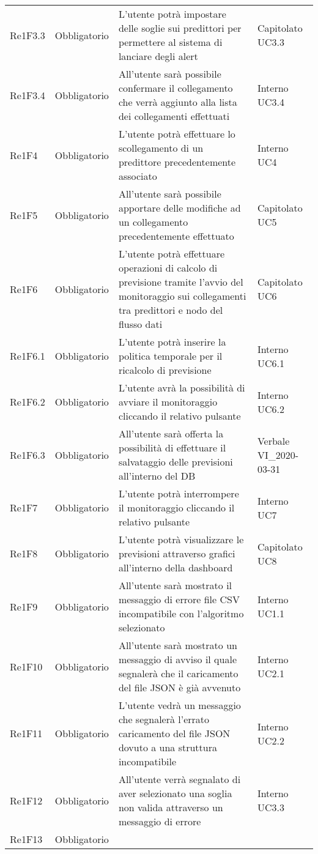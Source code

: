 \begin{longtable}{C{3cm} C{3cm} L{5.5cm} C{3cm}}
Re1F3.3 & Obbligatorio & L’utente potrà impostare delle soglie sui predittori per permettere al sistema di lanciare degli alert &  Capitolato UC3.3\\
Re1F3.4 & Obbligatorio & All’utente sarà possibile confermare il collegamento che verrà aggiunto alla lista dei collegamenti effettuati &  Interno UC3.4\\
Re1F4 & Obbligatorio & L’utente potrà effettuare lo scollegamento di un predittore precedentemente associato &  Interno UC4\\
Re1F5 & Obbligatorio & All’utente sarà possibile apportare delle modifiche ad un collegamento precedentemente effettuato & Capitolato UC5\\
Re1F6 & Obbligatorio & L’utente potrà effettuare operazioni di calcolo di previsione tramite l'avvio del monitoraggio sui collegamenti tra predittori e nodo del flusso dati &  Capitolato UC6\\
Re1F6.1 & Obbligatorio & L’utente potrà inserire la politica temporale per il ricalcolo di previsione &  Interno UC6.1\\
Re1F6.2 & Obbligatorio & L’utente avrà la possibilità di avviare il monitoraggio cliccando il relativo pulsante &  Interno UC6.2\\
Re1F6.3 & Obbligatorio & All’utente sarà offerta la possibilità di effettuare il salvataggio delle previsioni all'interno del DB &  Verbale VI\_2020-03-31\\
Re1F7 & Obbligatorio & L’utente potrà interrompere il monitoraggio cliccando il relativo pulsante& Interno UC7\\
Re1F8 & Obbligatorio & L’utente potrà visualizzare le previsioni attraverso grafici all'interno della dashboard &  Capitolato UC8\\
Re1F9 & Obbligatorio & All’utente sarà mostrato il messaggio di errore file CSV incompatibile con l'algoritmo selezionato &  Interno UC1.1\\
Re1F10 & Obbligatorio & All’utente sarà mostrato un messaggio di avviso il quale segnalerà che il caricamento del file JSON è già avvenuto &  Interno UC2.1\\
Re1F11 & Obbligatorio & L’utente vedrà un messaggio che segnalerà l’errato caricamento del file JSON dovuto a una struttura incompatibile &  Interno UC2.2\\
Re1F12 & Obbligatorio & All’utente verrà segnalato di aver selezionato una soglia non valida attraverso un messaggio di errore &  Interno
UC3.3\\
Re1F13 & Obbligatorio & 

\end{longtable}
